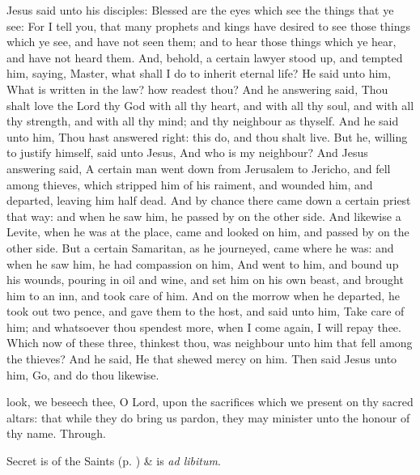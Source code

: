  Jesus said unto his disciples: Blessed are the eyes which see the things that ye see: For I tell you, that many prophets and kings have desired to see those things which ye see, and have not seen them; and to hear those things which ye hear, and have not heard them. And, behold, a certain lawyer stood up, and tempted him, saying, Master, what shall I do to inherit eternal life? He said unto him, What is written in the law? how readest thou? And he answering said, Thou shalt love the Lord thy God with all thy heart, and with all thy soul, and with all thy strength, and with all thy mind; and thy neighbour as thyself. And he said unto him, Thou hast answered right: this do, and thou shalt live. But he, willing to justify himself, said unto Jesus, And who is my neighbour? And Jesus answering said, A certain man went down from Jerusalem to Jericho, and fell among thieves, which stripped him of his raiment, and wounded him, and departed, leaving him half dead. And by chance there came down a certain priest that way: and when he saw him, he passed by on the other side. And likewise a Levite, when he was at the place, came and looked on him, and passed by on the other side. But a certain Samaritan, as he journeyed, came where he was: and when he saw him, he had compassion on him, And went to him, and bound up his wounds, pouring in oil and wine, and set him on his own beast, and brought him to an inn, and took care of him. And on the morrow when he departed, he took out two pence, and gave them to the host, and said unto him, Take care of him; and whatsoever thou spendest more, when I come again, I will repay thee. Which now of these three, thinkest thou, was neighbour unto him that fell among the thieves? And he said, He that shewed mercy on him. Then said Jesus unto him, Go, and do thou likewise.


\secret
{} look, we beseech thee, O Lord, upon the sacrifices which we present on thy sacred altars: that while they do bring us pardon, they may minister unto the honour of thy name. Through.
\begin{rubric}
     Secret is of the Saints (p. \pageref{SPSaints}) \&  is \emph{ad libitum}.
\end{rubric}


